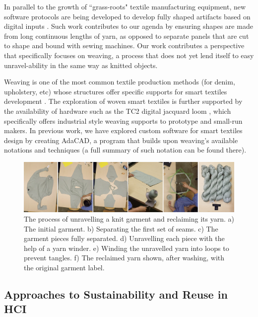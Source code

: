 In parallel to the growth of ``grass-roots" textile manufacturing equipment, new software protocols are being developed to develop fully shaped artifacts based on digital inputs \cite{mccann_compiler_2016, albaugh_digital_2019}. Such work contributes to our agenda by ensuring shapes are made from long continuous lengths of yarn, as opposed to separate panels that are cut to shape and bound with sewing machines. Our work contributes a perspective that specifically focuses on weaving, a process that does not yet lend itself to easy unravel-ability in the same way as knitted objects. 

Weaving is one of the most common textile production methods (for denim, upholstery, etc) whose structures offer specific supports for smart textiles development \cite{devendorf_adapting_2019, poupyrev_project_2016, worbin_designing_2010, orth_fabric_1998, mikkonen_weaving_2015}. The exploration of woven smart textiles is further supported by the availability of hardware such as the TC2 digital jacquard loom \cite{norway_tc2_nodate}, which specifically offers industrial style weaving supports to prototype and small-run makers. In previous work, we have explored custom software for smart textiles design by creating AdaCAD, a program that builds upon weaving's available notations and techniques \cite{friske_adacad:_2019} (a full summary of such notation can be found there).

\begin{figure}
    \centering
    \includegraphics[width=\linewidth]{figs/UF_unravelling_6panels.png}
    \caption[The process of unravelling a knit garment and reclaiming its yarn.]{The process of unravelling a knit garment and reclaiming its yarn. a) The initial garment. b) Separating the first set of seams. c) The garment pieces fully separated. d) Unravelling each piece with the help of a yarn winder. e) Winding the unravelled yarn into loops to prevent tangles. f) The reclaimed yarn shown, after washing, with the original garment label.}
    \label{fig:unravelProcess}
\end{figure}

\subsection{Approaches to Sustainability and Reuse in HCI}

